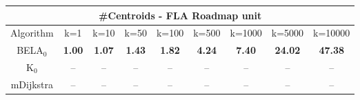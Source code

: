 \begin{tabular}{c|cccccccc}\toprule
\multicolumn{9}{c}{#Centroids - FLA Roadmap unit}\\ \midrule
Algorithm & k=1 & k=10 & k=50 & k=100 & k=500 & k=1000 & k=5000 & k=10000 \\ \midrule
BELA$_0$ & \textbf{1.00} & \textbf{1.07} & \textbf{1.43} & \textbf{1.82} & \textbf{4.24} & \textbf{7.40} & \textbf{24.02} & \textbf{47.38} \\
K$_0$ & -- & -- & -- & -- & -- & -- & -- & -- \\
mDijkstra & -- & -- & -- & -- & -- & -- & -- & -- \\ \bottomrule 
\end{tabular}
